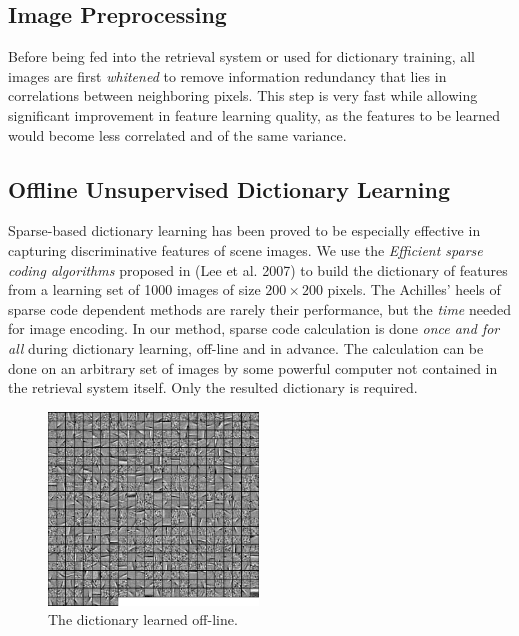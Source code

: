 \documentclass[letterpaper]{article}
\begin{document}
\subsection{Image Preprocessing}
Before being fed into the retrieval system or used for dictionary training, all images are first \emph{whitened} to remove information redundancy that lies in correlations between neighboring pixels. This step is very fast while allowing significant improvement in feature learning quality, as the features to be learned would become less correlated and of the same variance. 

\subsection{Offline Unsupervised Dictionary Learning}
\label{subsec:dictionary}
Sparse-based dictionary learning has been proved to be especially effective in capturing discriminative features of scene images. We use the \emph{Efficient sparse coding algorithms} proposed in (Lee et al. 2007) to build the dictionary of features from a learning set of 1000 images of size $200\times200$ pixels. The Achilles' heels of sparse code dependent methods are rarely their performance, but the \emph{time} needed for image encoding. In our method, sparse code calculation is done \emph{once and for all} during dictionary learning, off-line and in advance. The calculation can be done on an arbitrary set of images by some powerful computer not contained in the retrieval system itself. Only the resulted dictionary is required.

\begin{figure}[!ht]
		\centering
		\includegraphics[width=2.2in]{figures_dir/dict.png}
		\caption{The dictionary learned off-line.}
		\label{dictionary}
\end{figure}
\end{document}
